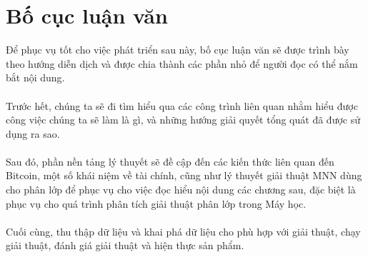 \section{Bố cục luận văn}
Để phục vụ tốt cho việc phát triển sau này, bố cục luận văn sẽ được trình bày 
theo hướng diễn dịch và được chia thành các phần nhỏ để người đọc có thể nắm 
bắt nội dung.\\\\
Trước hết, chúng ta sẽ đi tìm hiểu qua các công trình liên quan nhằm hiểu được 
công việc chúng ta sẽ làm là gì, và những hướng giải quyết tổng quát đã được 
sử dụng ra sao.\\\\
Sau đó, phần nền tảng lý thuyết sẽ đề cập đến các kiến thức liên quan đến Bitcoin, một số 
khái niệm về tài chính, cũng như lý thuyết giải thuật MNN dùng cho phân lớp để 
phục vụ cho việc đọc hiểu nội dung các chương sau, đặc biệt là phục vụ cho quá 
trình phân tích giải thuật phân lớp trong Máy học.\\\\
Cuối cùng, thu thập dữ liệu và khai phá dữ liệu cho phù hợp với giải thuật, 
chạy giải thuật, đánh giá giải thuật và hiện thực sản phẩm.
